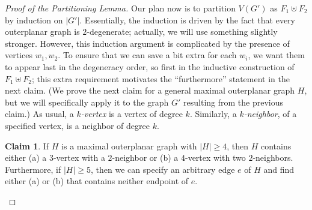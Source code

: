 \documentclass[11pt]{article}
\theoremstyle{definition}
\newtheorem{clm}{Claim}
\renewcommand\ge\geqslant
\begin{document}
\begin{proof}[Proof of the Partitioning Lemma]
	Our plan now is to partition $V(G')$ as $F_1\uplus F_2$ by induction on $|G'|$.  Essentially, the induction is driven by the fact that every
	outerplanar graph is $2$-degenerate; actually, we will use something slightly stronger.  However, this induction argument is complicated by
	the presence of vertices $w_1,w_2$.  To ensure that we can save a bit extra for each $w_i$, we want them to appear last in the degeneracy order, 
	so first in the inductive construction of $F_1\uplus F_2$; this extra requirement motivates the ``furthermore'' statement in the next claim.
	(We prove the next claim for a general maximal outerplanar graph $H$, but we will specifically apply it to the graph $G'$ resulting from the 
	previous claim.)  As usual, a \emph{$k$-vertex} is a vertex of degree $k$.  Similarly, a \emph{$k$-neighbor}, of a specified vertex, is a neighbor
	of degree $k$.

\begin{clm}
	If $H$ is a maximal outerplanar graph with $|H|\ge 4$, then $H$ contains either (a) a $3$-vertex with a $2$-neighbor or (b) a $4$-vertex with two 
	$2$-neighbors.  Furthermore, if $|H|\ge 5$, then we can specify an arbitrary edge $e$ of $H$ and find either (a) or (b) that contains neither 
	endpoint of $e$.
	\label{clm2}
\end{clm}


\begin{figure}[!b]
\centering
\begin{subfigure}{0.45\textwidth}
\centering
{}
\end{subfigure}
\end{figure}
\end{proof}
\end{document}
